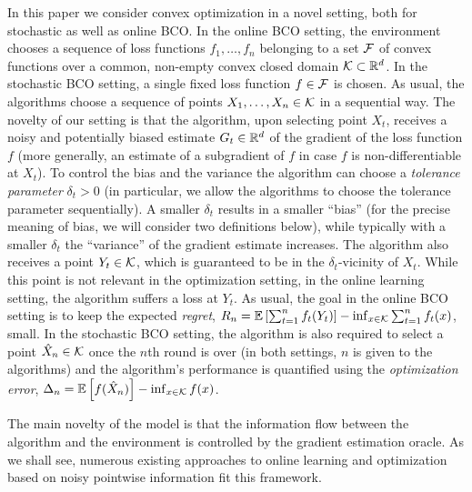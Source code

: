 In this paper we consider convex optimization in a novel setting, both for stochastic as well as online BCO.
In the online BCO setting, the environment chooses a sequence of loss functions $f_1,\dots,f_n$ belonging to a set $\mathcal{F}$ of convex functions over a common, non-empty convex closed domain $\mathcal{K}\subset \mathbb{R}^d$.
In the stochastic BCO setting, a single fixed loss function $f\in \mathcal{F}$ is chosen.
As usual, the algorithms choose a sequence of points $X_1,\dots,X_n\in \mathcal{K}$ in a sequential way.
The novelty of our setting is that the algorithm, upon selecting point $X_t$, receives
a noisy and potentially biased estimate $G_t\in \mathbb{R}^d$
of the gradient of the loss function $f$
(more generally, an estimate of a subgradient of $f$ in case $f$ is non-differentiable at $X_t$).
To control the bias and the variance the algorithm can choose a \emph{tolerance parameter} $\delta_t>0$
(in particular, we allow the algorithms to choose the tolerance parameter sequentially).
A smaller $\delta_t$ results in a smaller ``bias'' (for the precise meaning of bias, we will consider two definitions below), while typically with a smaller $\delta_t$ the ``variance'' of the gradient estimate increases.
The algorithm also receives a point $Y_t\in \mathcal{K}$, which is guaranteed to be in the $\delta_t$-vicinity of $X_t$.
While this point is not relevant in the optimization setting, in the online learning setting,
the algorithm suffers a loss at $Y_t$.
As usual, the goal in the online BCO setting is to keep the expected \emph{regret},
	$R_n =\mathbb{E}\left[ \sum_{t=1}^n f_t(Y_t)\right] - \inf_{x\in \mathcal{K}} \sum_{t=1}^n f_t(x)$,
small.
In the stochastic BCO setting, the algorithm is also required to select a point $\hat{X}_n\in \mathcal{K}$ once
the $n$th round is over (in both settings, $n$ is given to the algorithms)
and the algorithm's performance is quantified using the \emph{optimization error},
$\Delta_n = \mathbb{E}\left[f(\hat{X}_n)\right] - \inf_{x\in \mathcal{K}} f(x) $.

The main novelty of the model is that the information flow between the algorithm and the environment is controlled by the gradient estimation oracle. As we shall see, numerous existing approaches to online learning and optimization based on noisy pointwise information fit this framework.

